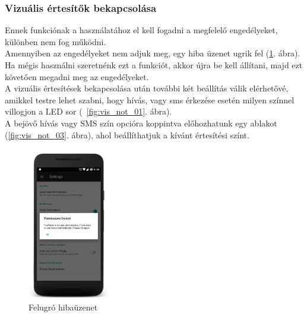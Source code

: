 \documentclass[../main.tex]{subfiles}
\begin{document}
            \subsubsection{Vizuális értesítők bekapcsolása}
                Ennek funkciónak a használatához el kell fogadni a megfelelő engedélyeket, különben nem fog működni.\\[3mm]
                Amennyiben az engedélyeket nem adjuk meg, egy hiba üzenet ugrik fel (\ref{fig:permission_denied}. ábra).\\[3mm]
                Ha mégis használni szeretnénk ezt a funkciót, akkor újra be kell állítani, majd ezt követően megadni meg az engedélyeket.\\[3mm]
                A vizuális értesítések bekapcsolása után további két beállítás válik elérhetővé, amikkel testre lehet szabni, hogy hívás, vagy sms érkezése esetén milyen színnel villogjon a LED sor (~\ref{fig:vis_not_01}. ábra).\\[3mm]
                A bejövő hívás vagy SMS szín opcióra koppintva előhozhatunk egy ablakot (\ref{fig:vis_not_03}. ábra), ahol beállíthatjuk a kívánt értesítési színt.
                
                \begin{figure}[ht!]
                    \centering
                    \includegraphics[width=3.6cm]{android_res/screen_pictures/visual_notification_02.png}
                    \caption{Felugró hibaüzenet}
                    \label{fig:permission_denied}
                \end{figure}
                
\end{document}
